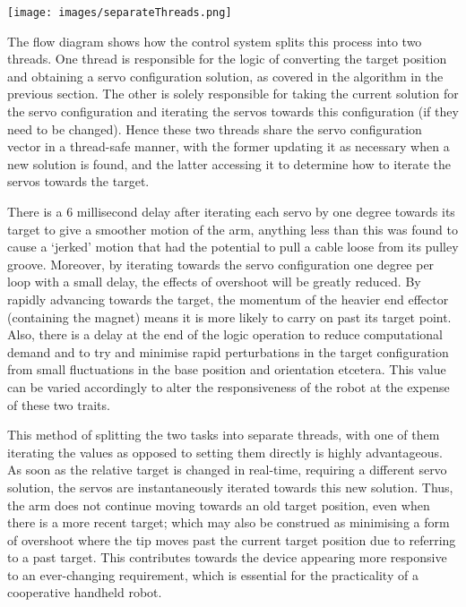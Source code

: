\documentclass[11pt]{article}
\begin{document}
\begin{center}
\texttt{[image: images/separateThreads.png]}
\label{figure:separateThreads}
\end{center}

The flow diagram shows how the control system splits this process into two threads. One thread is responsible for the logic of converting the target position and obtaining a servo configuration solution, as covered in the algorithm in the previous section. The other is solely responsible for taking the current solution for the servo configuration and iterating the servos towards this configuration (if they need to be changed). Hence these two threads share the servo configuration vector in a thread-safe manner, with the former updating it as necessary when a new solution is found, and the latter accessing it to determine how to iterate the servos towards the target. 

There is a 6 millisecond delay after iterating each servo by one degree towards its target to give a smoother motion of the arm, anything less than this was found to cause a `jerked' motion that had the potential to pull a cable loose from its pulley groove. Moreover, by iterating towards the servo configuration one degree per loop with a small delay, the effects of overshoot will be greatly reduced. By rapidly advancing towards the target, the momentum of the heavier end effector (containing the magnet) means it is more likely to carry on past its target point. Also, there is a delay at the end of the logic operation to reduce computational demand and to try and minimise rapid perturbations in the target configuration from small fluctuations in the base position and orientation etcetera. This value can be varied accordingly to alter the responsiveness of the robot at the expense of these two traits. 

This method of splitting the two tasks into separate threads, with one of them iterating the values as opposed to setting them directly is highly advantageous. As soon as the relative target is changed in real-time, requiring a different servo solution, the servos are instantaneously iterated towards this new solution. Thus, the arm does not continue moving towards an old target position, even when there is a more recent target; which may also be construed as minimising a form of overshoot where the tip moves past the current target position due to referring to a past target. This contributes towards the device appearing more responsive to an ever-changing requirement, which is essential for the practicality of a cooperative handheld robot. 
\end{document}
